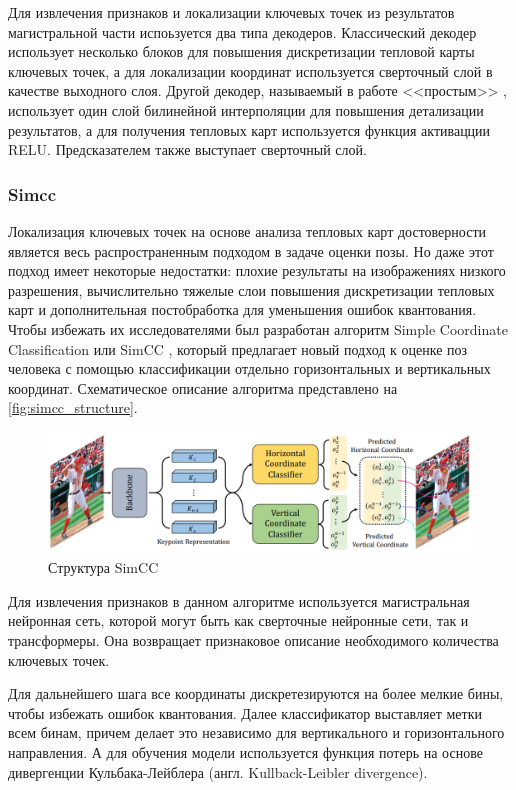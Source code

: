 Для извлечения признаков и локализации ключевых точек из результатов магистральной части испоьзуется два типа декодеров. Классический декодер использует несколько блоков для повышения дискретизации тепловой карты ключевых точек, а для локализации координат используется сверточный слой в качестве выходного слоя. Другой декодер, называемый в работе <<простым>> \cite{vitpose}, использует один слой билинейной интерполяции для повышения детализации результатов, а для получения тепловых карт используется функция активацции RELU. Предсказателем также выступает сверточный слой.


\subsubsection*{Simcc}
\label{subsec:simcc}

Локализация ключевых точек на основе анализа тепловых карт достоверности является весь распространенным подходом в задаче оценки позы. Но даже этот подход имеет некоторые недостатки: плохие результаты на изображениях низкого разрешения, вычислительно тяжелые слои повышения дискретизации тепловых карт и дополнительная постобработка для уменьшения ошибок квантования. Чтобы избежать их исследователями был разработан алгоритм Simple Coordinate Classification или SimCC \cite{simcc}, который предлагает новый подход к оценке поз человека с помощью классификации отдельно горизонтальных и вертикальных координат. Схематическое описание алгоритма представлено на \autoref{fig:simcc_structure}.

\begin{figure}[h]
	\centering
	\includegraphics[width=\textwidth]{./images/simcc_structure}
	\caption{Структура SimCC \cite{simcc}}
	\label{fig:simcc_structure}
\end{figure}

Для извлечения признаков в данном алгоритме используется магистральная нейронная сеть, которой могут быть как сверточные нейронные сети, так и трансформеры. Она возвращает признаковое описание необходимого количества ключевых точек.

Для дальнейшего шага все координаты дискретезируются на более мелкие бины, чтобы избежать ошибок квантования. Далее классификатор выставляет метки всем бинам, причем делает это независимо для вертикального и горизонтального направления. А для обучения модели используется функция потерь на основе дивергенции Кульбака-Лейблера (англ. Kullback-Leibler divergence).

